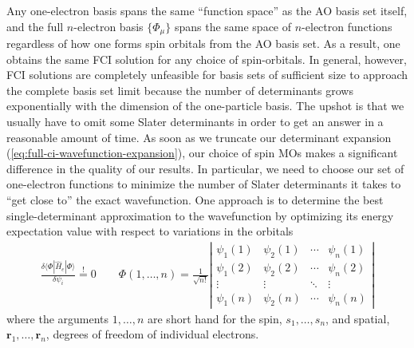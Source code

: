Any one-electron basis spans the same ``function space'' as the AO basis set
itself, and the full $n$-electron basis $\{\Phi_\mu\}$ spans the same space of
$n$-electron functions regardless of how one forms spin orbitals from the AO
basis set.
As a result, one obtains the same FCI solution for any choice of spin-orbitals.
In general, however, FCI solutions are completely unfeasible for basis sets of
sufficient size to approach the complete basis set limit because the number of
determinants grows exponentially with the dimension of the one-particle basis.
The upshot is that we usually have to omit some Slater determinants in order to get an answer in a reasonable amount of time.
As soon as we truncate our determinant expansion
(\ref{eq:full-ci-wavefunction-expansion}), our choice of spin MOs makes a
significant difference in the quality of our results.
In particular, we need to choose our set of one-electron functions to minimize
the number of Slater determinants it takes to ``get close to'' the exact
wavefunction.
One approach is to determine the best single-determinant approximation to the
wavefunction by optimizing its energy expectation value with respect to
variations in the orbitals
\begin{align}
    \frac{\delta\langle\Phi|\hat{H}_e|\Phi\rangle}{\delta\psi_i}
    \overset{!}{=}
    0
    \qquad
    \Phi(1,\ldots,n)
    =
    \frac{1}{\sqrt{n!}}
    \left|
    \begin{matrix}
      \psi_1(1)&\psi_2(1)&\cdots&\psi_n(1)\\
      \psi_1(2)&\psi_2(2)&\cdots&\psi_n(2)\\
      \vdots    &\vdots    &\ddots&\vdots    \\
      \psi_1(n)&\psi_2(n)&\cdots&\psi_n(n)
    \end{matrix}
    \right|
\end{align}
where the arguments \(1,\ldots,n\) are short hand for the spin,
\(s_1,\ldots,s_n\), and spatial, \(\mathbf{r}_1,\ldots,\mathbf{r}_n\), degrees
of freedom of individual electrons.

